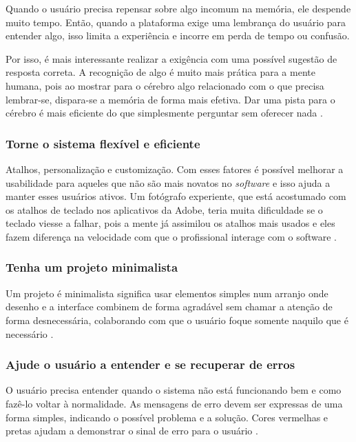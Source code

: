 Quando o usuário precisa repensar sobre algo incomum na memória, ele despende muito tempo. Então, quando a plataforma exige uma lembrança do usuário para entender algo, isso limita a experiência e incorre em perda de tempo ou confusão.

Por isso, é mais interessante realizar a exigência com uma possível sugestão de resposta correta. A recognição de algo é muito mais prática para a mente humana, pois ao mostrar para o cérebro algo relacionado com o que precisa lembrar-se, dispara-se a memória de forma mais efetiva. Dar uma pista para o cérebro é mais eficiente do que simplesmente perguntar sem oferecer nada \cite{site:nielsenRecall}.

\subsubsection{Torne o sistema flexível e eficiente}

Atalhos, personalização e customização. Com esses fatores é possível melhorar a usabilidade para aqueles que não são mais novatos no \textit{software} e isso ajuda a manter esses usuários ativos. Um fotógrafo experiente, que está acostumado com os atalhos de teclado nos aplicativos da Adobe, teria muita dificuldade se o teclado viesse a falhar, pois a mente já assimilou os atalhos mais usados e eles fazem diferença na velocidade com que o profissional interage com o software \cite{site:nielsenFlexibility}.

\subsubsection{Tenha um projeto minimalista}

Um projeto é minimalista significa usar elementos simples num arranjo onde desenho e a interface combinem de forma agradável sem chamar a atenção de forma desnecessária, colaborando com que o usuário foque somente naquilo que é necessário \cite{site:nielsen}.

\subsubsection{Ajude o usuário a entender e se recuperar de erros}

O usuário precisa entender quando o sistema não está funcionando bem e como fazê-lo voltar à normalidade. As mensagens de erro devem ser expressas de uma forma simples, indicando o possível problema e a solução. 
Cores vermelhas e pretas ajudam a demonstrar o sinal de erro para o usuário \cite{site:nielsenError}.

